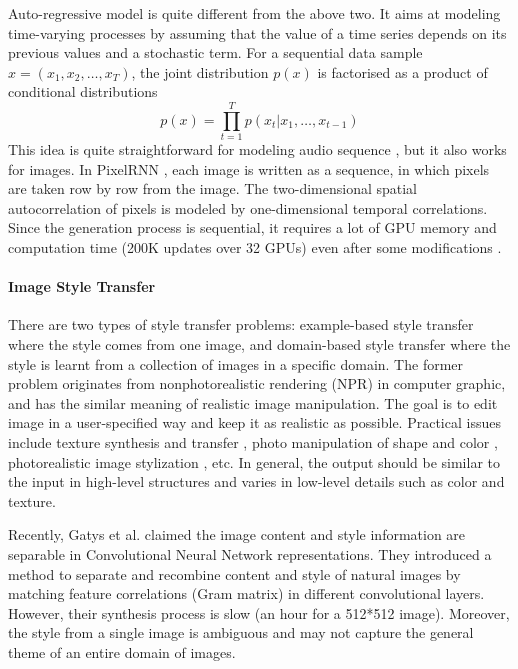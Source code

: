 \documentclass{article}
\begin{document}
Auto-regressive model is quite different from the above two. It aims at modeling time-varying processes by assuming that the value of a time series depends on its previous values and a stochastic term. For a sequential data sample $x = (x_1, x_2, \ldots, x_T)$, the joint distribution $p(x)$ is factorised as a product of conditional distributions
\begin{equation}
p(x) = \prod_{t=1}^{T} p(x_t|x_1, \ldots, x_{t-1})
\end{equation}
This idea is quite straightforward for modeling audio sequence \cite{van2016wavenet}, but it also works for images. In PixelRNN \cite{VanDenOord:2016:PRN:3045390.3045575}, each image is written as a sequence, in which pixels are taken row by row from the image. The two-dimensional spatial autocorrelation of pixels is modeled by one-dimensional temporal correlations. Since the generation process is sequential, it requires a lot of GPU memory and computation time (200K updates over 32 GPUs) even after some modifications \cite{NIPS2016_6527}.


\paragraph{Image Style Transfer} %
There are two types of style transfer problems: example-based style transfer where the style comes from one image, and domain-based style transfer where the style is learnt from a collection of images in a specific domain. The former problem originates from nonphotorealistic rendering (NPR) \cite{6243138} in computer graphic, and has the similar meaning of realistic image manipulation. The goal is to edit image in a user-specified way and keep it as realistic as possible. Practical issues include texture synthesis and transfer \cite{7874180}, photo manipulation of shape and color \cite{10.1007/978-3-319-46454-1_36}, photorealistic image stylization \cite{Li_2018_ECCV}, etc. In general, the output should be similar to the input in high-level structures and varies in low-level details such as color and texture.

Recently, Gatys et al. \cite{gatys2016image} claimed the image content and style information are separable in Convolutional Neural Network representations. They introduced a method \cite{DBLP:journals/corr/GatysEB15a} to separate and recombine content and style of natural images by matching feature correlations (Gram matrix) in different convolutional layers. However, their synthesis process is slow (an hour for a 512*512 image). Moreover, the style from a single image is ambiguous and may not capture the general theme of an entire domain of images.
\end{document}
